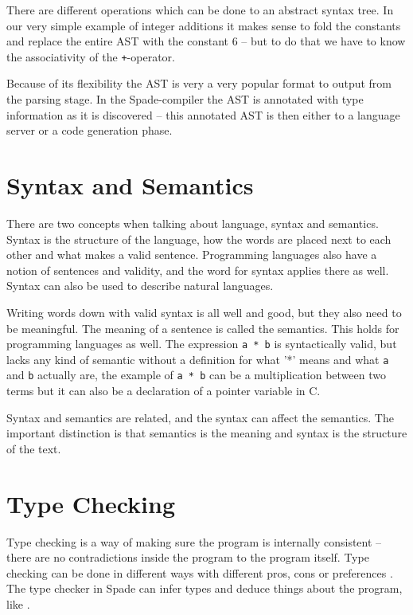 There are different operations which can be done to an abstract syntax tree. In our very simple example of integer additions it makes sense to fold the constants and replace the entire AST with the constant 6 -- but to do that we have to know the associativity of the \verb!+!-operator.

Because of its flexibility the AST is very a very popular format to output from the parsing stage. In the Spade-compiler the AST is annotated with type information as it is discovered -- this annotated AST is then either to a language server or a code generation phase.

\section{Syntax and Semantics}
There are two concepts when talking about language, syntax and semantics. Syntax is the structure of the language, how the words are placed next to each other and what makes a valid sentence. Programming languages also have a notion of sentences and validity, and the word for syntax applies there as well. Syntax can also be used to describe natural languages.

Writing words down with valid syntax is all well and good, but they also need to be meaningful. The meaning of a sentence is called the semantics. This holds for programming languages as well. The expression \verb+a * b+ is syntactically valid, but lacks any kind of semantic without a definition for what '*' means and what \verb+a+ and \verb+b+ actually are, the example of \verb+a * b+ can be a multiplication between two terms but it can also be a declaration of a pointer variable in C.

Syntax and semantics are related, and the syntax can affect the semantics. The important distinction is that semantics is the meaning and syntax is the structure of the text.

\section{Type Checking} %
\label{sec:TypeChecking}
Type checking is a way of making sure the program is internally consistent -- there are no contradictions inside the program to the program itself. Type checking can be done in different ways with different pros, cons or preferences \cite{src:TypeCheckersBook}. The type checker in Spade can infer types and deduce things about the program, like  \cite{src:spadeAnHDL}.

